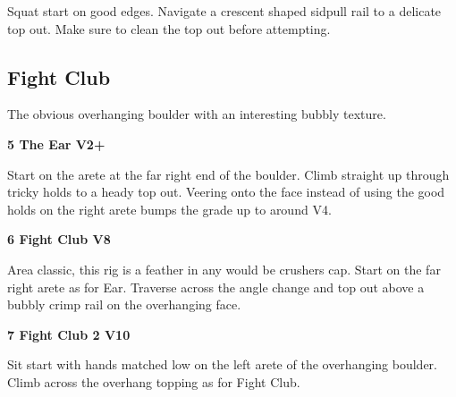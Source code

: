 \begin{multicols}{2}
			\begin{adjustwidth}{0.5cm}{}			
			Squat start on good edges. Navigate a crescent shaped sidpull rail to a delicate top out. Make sure to clean the top out before attempting.
			\end{adjustwidth}
			
			
		
		
		\needspace{1.5cm}
		\subsection*{Fight Club}\label{bf:Fight Club}
		The obvious overhanging boulder with an interesting bubbly texture.\\
	
		
			
			\needspace{1.5cm}
\label{rt:The Ear}
\colorbox{green!20}{
\parbox{0.95\linewidth}{
\textbf{
5 The Ear V2+  
}}}

			\begin{adjustwidth}{0.5cm}{}			
			Start on the arete at the far right end of the boulder. Climb straight up through tricky holds to a heady top out. Veering onto the face instead of using the good holds on the right arete bumps the grade up to around V4.
			\end{adjustwidth}
			
			
			
			\needspace{1.5cm}
\label{rt:Fight Club}
\colorbox{Goldenrod!50}{
\parbox{0.95\linewidth}{
\textbf{
6 Fight Club V8  
}}}

			\begin{adjustwidth}{0.5cm}{}			
			Area classic, this rig is a feather in any would be crushers cap. Start on the far right arete as for Ear. Traverse across the angle change and top out above a bubbly crimp rail on the overhanging face.
			\end{adjustwidth}
			
			


			\needspace{1.5cm}
\label{rt:Fight Club 2}
\colorbox{red!20}{
\parbox{0.95\linewidth}{
\textbf{
7 Fight Club 2 V10  
}}}

			\begin{adjustwidth}{0.5cm}{}			
			Sit start with hands matched low on the left arete of the overhanging boulder. Climb across the overhang topping as for Fight Club.
			\end{adjustwidth}
			

\end{multicols}
